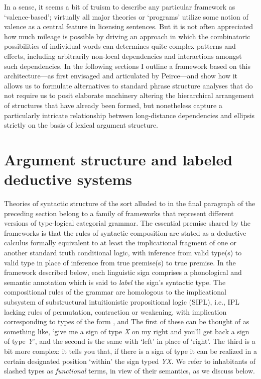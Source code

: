 \documentclass[output=paper,colorlinks,citecolor=brown]{langscibook}
\begin{document}
In a sense, it seems a bit of truism to describe any particular
framework as `valence-based'; virtually all major theories or
`programs' utilize some notion of valence as a central feature in
licensing sentences. But it is not often appreciated how much mileage
is possible by driving an approach in which the combinatoric
possibilities of individual words can determines quite complex
patterns and effects, including arbitrarily non-local dependencies and
interactions amongst such dependencies. In the following sections I
outline a framework based on this architecture---as first envisaged
and articulated by Peirce---and show how it allows us to formulate
alternatives to standard phrase structure analyses that do not require
us to posit elaborate machinery altering the hierarchical arrangement
of structures that have already been formed, but nonetheless capture a
particularly intricate relationship between long-distance dependencies
and ellipsis strictly on the basis of lexical argument structure.



\section{Argument structure and labeled deductive systems\label{sec:argstruc}}

Theories of syntactic structure of the sort alluded to in the final
paragraph of the preceding section belong to a family of frameworks
that represent different versions of type-logical categorial grammar.
The essential premise shared by the frameworks is that the rules of
syntactic composition are stated as a deductive calculus formally
equivalent to at least the implicational fragment of one or another
standard truth conditional logic, with inference from valid type(s) to
valid type in place of inference from true premise(s) to true
premise. In the framework described below, each linguistic sign
comprises a phonological and semantic annotation which is said to
\textsl{label} the sign's syntactic type. The compositional rules of
the grammar are homologous to the implicational subsystem of
substructural intuitionistic propositional logic (SIPL), i.e.,
IPL lacking rules of permutation, contraction or weakening, with implication
corresponding to types of the form ,  and  The
first of these can be thought of as something like, `give me a sign of
type \textit{X} on my right and you'll get back a sign of type  \textit{Y}', and the
second is the same with `left' in place of `right'. The third is a bit
more complex: it tells you that, if there is a sign of type it can be
realized in a certain designated position `within' the sign typed
\textit{Y}\vs \textit{X}. We refer to inhabitants of slashed types as
\textsl{functional} terms, in view of their semantics, as we discuss below. 
\end{document}
